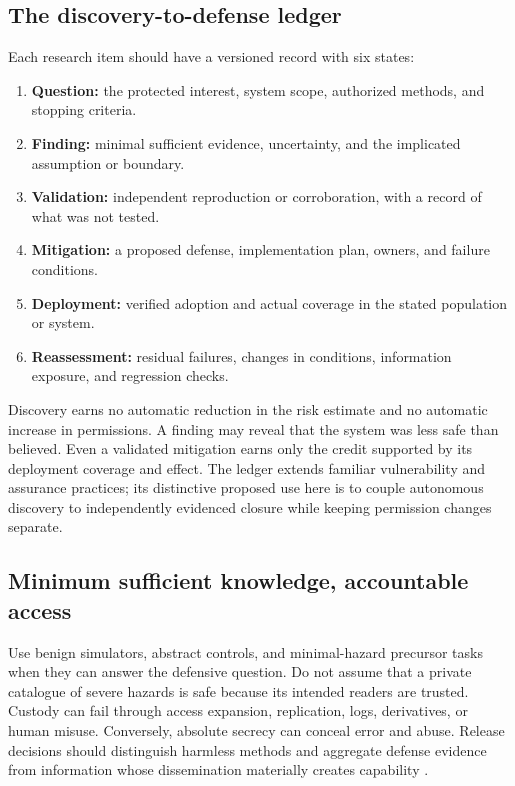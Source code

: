 \documentclass[10pt,twocolumn,letterpaper]{article}
\begin{document}
\subsection{The discovery-to-defense ledger}
Each research item should have a versioned record with six states:
\begin{enumerate}
\item \textbf{Question:} the protected interest, system scope, authorized methods, and stopping criteria.
\item \textbf{Finding:} minimal sufficient evidence, uncertainty, and the implicated assumption or boundary.
\item \textbf{Validation:} independent reproduction or corroboration, with a record of what was not tested.
\item \textbf{Mitigation:} a proposed defense, implementation plan, owners, and failure conditions.
\item \textbf{Deployment:} verified adoption and actual coverage in the stated population or system.
\item \textbf{Reassessment:} residual failures, changes in conditions, information exposure, and regression checks.
\end{enumerate}
Discovery earns no automatic reduction in the risk estimate and no automatic increase in permissions. A finding may reveal that the system was less safe than believed. Even a validated mitigation earns only the credit supported by its deployment coverage and effect. The ledger extends familiar vulnerability and assurance practices; its distinctive proposed use here is to couple autonomous discovery to independently evidenced closure while keeping permission changes separate.

\subsection{Minimum sufficient knowledge, accountable access}
Use benign simulators, abstract controls, and minimal-hazard precursor tasks when they can answer the defensive question. Do not assume that a private catalogue of severe hazards is safe because its intended readers are trusted. Custody can fail through access expansion, replication, logs, derivatives, or human misuse. Conversely, absolute secrecy can conceal error and abuse. Release decisions should distinguish harmless methods and aggregate defense evidence from information whose dissemination materially creates capability \cite{infohazards}.
\end{document}
